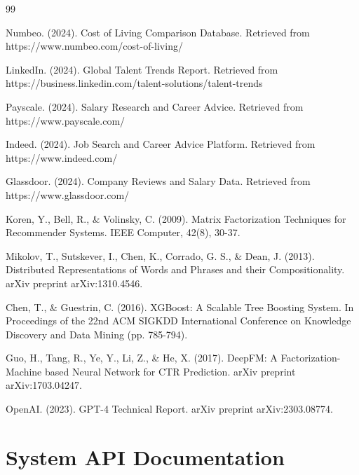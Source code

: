 \documentclass[12pt,a4paper,oneside]{report}
\begin{document}
\newpage
\begin{thebibliography}{99}

 Numbeo. (2024). Cost of Living Comparison Database. Retrieved from https://www.numbeo.com/cost-of-living/

 LinkedIn. (2024). Global Talent Trends Report. Retrieved from https://business.linkedin.com/talent-solutions/talent-trends

 Payscale. (2024). Salary Research and Career Advice. Retrieved from https://www.payscale.com/

 Indeed. (2024). Job Search and Career Advice Platform. Retrieved from https://www.indeed.com/

 Glassdoor. (2024). Company Reviews and Salary Data. Retrieved from https://www.glassdoor.com/

 Koren, Y., Bell, R., \& Volinsky, C. (2009). Matrix Factorization Techniques for Recommender Systems. IEEE Computer, 42(8), 30-37.

 Mikolov, T., Sutskever, I., Chen, K., Corrado, G. S., \& Dean, J. (2013). Distributed Representations of Words and Phrases and their Compositionality. arXiv preprint arXiv:1310.4546.

 Chen, T., \& Guestrin, C. (2016). XGBoost: A Scalable Tree Boosting System. In Proceedings of the 22nd ACM SIGKDD International Conference on Knowledge Discovery and Data Mining (pp. 785-794).

 Guo, H., Tang, R., Ye, Y., Li, Z., \& He, X. (2017). DeepFM: A Factorization-Machine based Neural Network for CTR Prediction. arXiv preprint arXiv:1703.04247.

 OpenAI. (2023). GPT-4 Technical Report. arXiv preprint arXiv:2303.08774.

\end{thebibliography}

\appendix

\chapter{System API Documentation}
\end{document}
